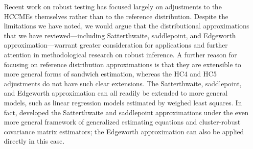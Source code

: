 \documentclass[12pt]{article}\usepackage[]{graphicx}\usepackage[]{color}
\begin{document}
Recent work on robust testing has focused largely on adjustments to the HCCMEs themselves \citep[e.g.,][]{Li2016new, Hartigan2016alternative} rather than to the reference distribution. 
Despite the limitations we have noted, we would argue that the distributional approximations that we have reviewed---including Satterthwaite, saddlepoint, and Edgeworth approximation---warrant greater consideration for applications and further attention in methodological research on robust inference. 
A further reason for focusing on reference distribution approximations is that they are extensible to more general forms of sandwich estimation, whereas the HC4 and HC5 adjustments do not have such clear extensions. The Satterthwaite, saddlepoint, and Edgeworth approximation can all readily be extended to more general models, such as linear regression models estimated by weighed least squares. In fact, \citet{McCaffrey2006improved} developed the Satterthwaite and saddlepoint approximations under the even more general framework of generalized estimating equations and cluster-robust covariance matrix estimators; the \citet{Kauermann2001note} Edgeworth approximation can also be applied directly in this case. 



\end{document}
